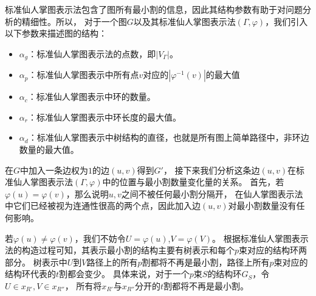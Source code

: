 标准仙人掌图表示法包含了图所有最小割的信息，因此其结构参数有助于对问题分析的精细性。所以，
对于一个图$G$以及其标准仙人掌图表示法$(\Gamma,\varphi)$，我们引入以下参数来描述图的结构：
\begin{itemize}
  \item $\alpha_{g}$：标准仙人掌图表示法的点数，即$|V_{\Gamma}|$。
  \item $\alpha_{p}$：标准仙人掌图表示中所有点$v$对应的$|\varphi^{-1}(v)|$的最大值%
  \item $\alpha_{c}$：标准仙人掌图表示中环的数量。
  \item $\alpha_{r}$：标准仙人掌图表示中环长度的最大值。
  \item $\alpha_{d}$：标准仙人掌图表示中树结构的直径，也就是所有图上简单路径中，非环边数量的最大值。
\end{itemize}


在$G$中加入一条边权为$1$的边$(u,v)$得到$G'$，
接下来我们分析这条边$(u,v)$在标准仙人掌图表示法$(\Gamma,\varphi)$中的位置与最小割数量变化量的关系。
首先，若$\varphi(u)=\varphi(v)$，那么说明$u,v$之间不被任何最小割分隔开，
在仙人掌图表示法中它们已经被视为连通性很高的两个点，因此加入边$(u,v)$对最小割数量没有任何影响。

若$\varphi(u)\neq\varphi(v)$，我们不妨令$U=\varphi(u)$,$V=\varphi(V)$。
根据标准仙人掌图表示法的构造过程可知，其表示最小割的结构主要有树表示和每个$p$束对应的结构环两部分。
树表示中$U$到$V$路径上的所有$p$割都将不再是最小割，路径上所有$p$束对应的结构环代表的$t$割都会变少。
具体来说，对于一个$p$束$S$的结构环$G_S$，令$U\in x_{R'},V\in x_{R''}$，
所有将$x_{R'}$与$x_{R''}$分开的$t$割都将不再是最小割。

